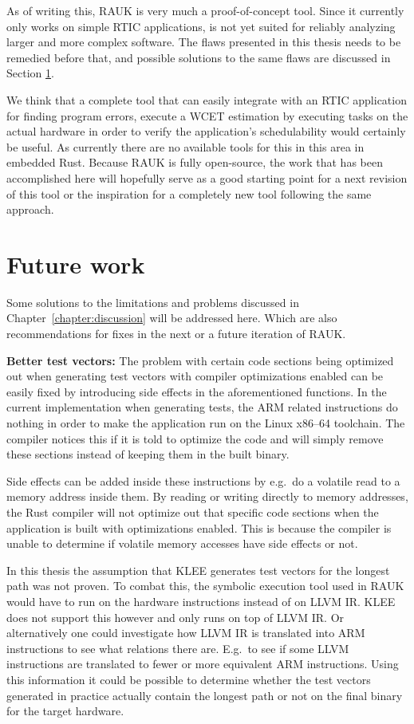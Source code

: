 As of writing this, RAUK is very much a proof-of-concept tool. Since it
currently only works on simple RTIC applications, is not yet suited for
reliably analyzing larger and more complex software. The flaws presented in
this thesis needs to be remedied before that, and possible solutions to the
same flaws are discussed in Section \ref{chapter:futurework}.

We think that a complete tool that can easily integrate with an RTIC
application for finding program errors, execute a WCET estimation by executing
tasks on the actual hardware in order to verify the application's
schedulability would certainly be useful. As currently there are no available
tools for this in this area in embedded Rust. Because RAUK is fully
open-source, the work that has been accomplished here will hopefully serve as a
good starting point for a next revision of this tool or the inspiration for a
completely new tool following the same approach.

\section{Future work}
\label{chapter:futurework}
Some solutions to the limitations and problems discussed in Chapter~\ref{chapter:discussion} 
will be addressed here. Which are also recommendations for fixes in the next or a future iteration of RAUK\@.

\textbf{Better test vectors:} The problem with certain code sections being
optimized out when generating test vectors with compiler optimizations enabled
can be easily fixed by introducing side effects in the aforementioned
functions. In the current implementation when generating tests, the ARM related
instructions do nothing in order to make the application run on the Linux
x86--64 toolchain. The compiler notices this if it is told to optimize the code
and will simply remove these sections instead of keeping them in the built
binary.

Side effects can be added inside these instructions by e.g.\ do a volatile
read to a memory address inside them. By reading or writing directly to memory
addresses, the Rust compiler will not optimize out that specific code sections
when the application is built with optimizations enabled. This is because the
compiler is unable to determine if volatile memory accesses have side effects
or not.

In this thesis the assumption that KLEE generates test vectors for the longest
path was not proven. To combat this, the symbolic execution tool used in RAUK
would have to run on the hardware instructions instead of on LLVM IR\@. KLEE does
not support this however and only runs on top of LLVM IR\@. Or alternatively one
could investigate how LLVM IR is translated into ARM instructions to see what
relations there are. E.g.\ to see if some LLVM instructions are translated to
fewer or more equivalent ARM instructions. Using this information it could
be possible to determine whether the test vectors generated in practice
actually contain the longest path or not on the final binary for the target
hardware.


